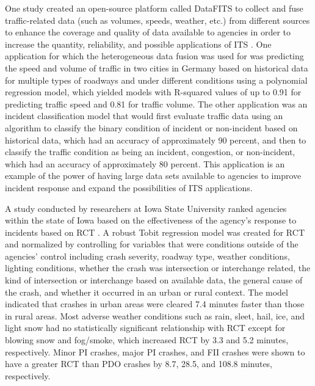 \documentclass[
  letterpaper,
  authoryear]{elsarticle}
\begin{document}
One study created an open-source platform called DataFITS to collect and
fuse traffic-related data (such as volumes, speeds, weather, etc.) from
different sources to enhance the coverage and quality of data available
to agencies in order to increase the quantity, reliability, and possible
applications of ITS \citep{zisner_datafits_2023}. One application for
which the heterogeneous data fusion was used for was predicting the
speed and volume of traffic in two cities in Germany based on historical
data for multiple types of roadways and under different conditions using
a polynomial regression model, which yielded models with R-squared
values of up to 0.91 for predicting traffic speed and 0.81 for traffic
volume. The other application was an incident classification model that
would first evaluate traffic data using an algorithm to classify the
binary condition of incident or non-incident based on historical data,
which had an accuracy of approximately 90 percent, and then to classify
the traffic condition as being an incident, congestion, or non-incident,
which had an accuracy of approximately 80 percent. This application is
an example of the power of having large data sets available to agencies
to improve incident response and expand the possibilities of ITS
applications.

A study conducted by researchers at Iowa State University ranked
agencies within the state of Iowa based on the effectiveness of the
agency's response to incidents based on RCT
\citep{mumtarin_traffic_2023}. A robust Tobit regression model was
created for RCT and normalized by controlling for variables that were
conditions outside of the agencies' control including crash severity,
roadway type, weather conditions, lighting conditions, whether the crash
was intersection or interchange related, the kind of intersection or
interchange based on available data, the general cause of the crash, and
whether it occurred in an urban or rural context. The model indicated
that crashes in urban areas were cleared 7.4 minutes faster than those
in rural areas. Most adverse weather conditions such as rain, sleet,
hail, ice, and light snow had no statistically significant relationship
with RCT except for blowing snow and fog/smoke, which increased RCT by
3.3 and 5.2 minutes, respectively. Minor PI crashes, major PI crashes,
and FII crashes were shown to have a greater RCT than PDO crashes by
8.7, 28.5, and 108.8 minutes, respectively.
\end{document}
